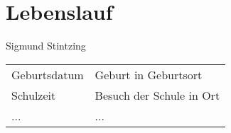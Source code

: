 \chapter*{Lebenslauf}

Sigmund Stintzing

\vspace*{2.0cm}

\begin{tabular}{ll}

Geburtsdatum & Geburt in Geburtsort \\[1.5ex]
Schulzeit & Besuch der Schule in Ort \\[1.5ex]
 ... & ...
\end{tabular}
